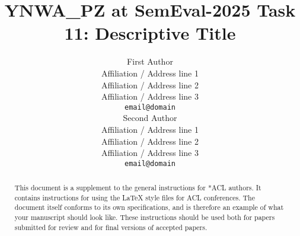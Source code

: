 \documentclass[11pt]{article}
\title{YNWA\_PZ at SemEval-2025 Task 11: Descriptive Title}
\author{First Author \\
  Affiliation / Address line 1 \\
  Affiliation / Address line 2 \\
  Affiliation / Address line 3 \\
  \texttt{email@domain} \\\And
  Second Author \\
  Affiliation / Address line 1 \\
  Affiliation / Address line 2 \\
  Affiliation / Address line 3 \\
  \texttt{email@domain} \\}
\begin{document}
\maketitle
\begin{abstract}
  This document is a supplement to the general instructions for *ACL authors. It contains instructions for using the \LaTeX{} style files for ACL conferences.
  The document itself conforms to its own specifications, and is therefore an example of what your manuscript should look like.
  These instructions should be used both for papers submitted for review and for final versions of accepted papers.
\end{abstract}












\appendix



\end{document}
